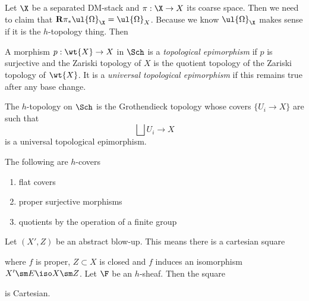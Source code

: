 \documentclass[12pt]{article}
\begin{document}
\newcommand{\R}{\mathbf{R}}

Let $\X$ be a separated DM-stack and $\pi : \X \to X$ its coarse space. Then we need to claim that $\R \pi_* \ul{\Omega}_{\X} = \ul{\Omega}_{X}$. Because we know $\ul{\Omega}_{\X}$ makes sense if it is the $h$-topology thing. Then 


\begin{defn}
A morphism $p : \wt{X} \to X$ in $\Sch$ is a \textit{topological epimorphism} if $p$ is surjective and the Zariski topology of $X$ is the quotient topology of the Zariski topology of $\wt{X}$. It is a \textit{universal topological epimorphism} if this remains true after any base change.
\end{defn}

\begin{defn}
The $h$-topology on $\Sch$ is the Grothendieck topology whose covers $\{ U_i \to X \}$ are such that
\[ \bigsqcup U_i \to X \]
is a universal topological epimorphism.
\end{defn}

\begin{example}
The following are $h$-covers
\begin{enumerate}
\item flat covers
\item proper surjective morphisms
\item quotients by the operation of a finite group
\end{enumerate}
\end{example}

\begin{prop}
Let $(X', Z)$ be an abstract blow-up. This means there is a cartesian square
\begin{center}
\end{center}
where $f$ is proper, $Z \subset X$ is closed and $f$ induces an isomorphism $X' \sm E \iso X \sm Z$. Let $\F$ be an $h$-sheaf. Then the square
\begin{center}
\end{center}
is Cartesian.
\end{prop}
\end{document}
